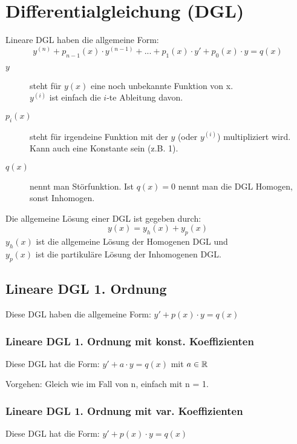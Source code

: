 \section{Differentialgleichung (DGL)}
{\small
Lineare DGL haben die allgemeine Form:
\vspace{-0.2cm}\[
	y^{(n)} + p_{n-1}(x) \cdot y^{(n-1)} + ... + p_1(x) \cdot y' + p_0(x) \cdot y = q(x) 
\]
\begin{description}
	\item [$y$] steht für $y(x)$ eine noch unbekannte Funktion von x.\\
			$y^{(i)}$ ist einfach die $i$-te Ableitung davon.

	\item [$p_i(x)$] steht für irgendeine Funktion mit der $y$ (oder $y^{(i)}$) multipliziert wird. Kann auch eine Konstante sein (z.B. 1).

	\item [$q(x)$] nennt man Störfunktion. Ist $q(x) = 0$ nennt man die DGL Homogen, sonst Inhomogen.
\end{description}

Die allgemeine Lösung einer DGL ist gegeben durch:
\vspace{-0.2cm}\[
	y(x) = y_h(x) + y_p(x)
\]
$y_h(x)$ ist die allgemeine Lösung der Homogenen DGL und\\
$y_p(x)$ ist die partikuläre Lösung der Inhomogenen DGL.
}

\subsection{Lineare DGL 1. Ordnung}
\vspace{-0.1cm}Diese DGL haben die allgemeine Form: $y' + p(x) \cdot y = q(x)$

\subsubsection{Lineare DGL 1. Ordnung mit konst. Koeffizienten}
\vspace{-0.1cm}Diese DGL hat die Form: $y' + a \cdot y = q(x)$ mit $a \in \mathbb{R}$

Vorgehen: Gleich wie im Fall von n, einfach mit n = 1.

\subsubsection{Lineare DGL 1. Ordnung mit var. Koeffizienten}
Diese DGL hat die Form: $y' + p(x) \cdot y = q(x)$

